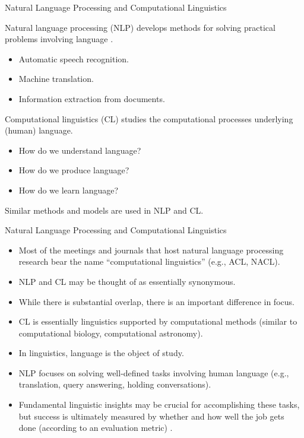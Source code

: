 \documentclass[handout]{beamer}
\begin{document}
\begin{frame}{Natural Language Processing and Computational Linguistics}
\begin{scriptsize}
Natural language processing (NLP) develops methods for solving practical problems involving language \cite{JohnsonMLSS}. \\


\begin{itemize}
\item Automatic speech recognition.
\item Machine translation.
\item Information extraction from documents.
\end{itemize}

Computational linguistics (CL) studies the computational processes underlying (human) language.

\begin{itemize}
 \item How do we understand language?
 \item How do we produce language?
 \item How do we learn language?
\end{itemize}

Similar methods and models are used in NLP and CL.
\end{scriptsize}
\end{frame}


\begin{frame}{Natural Language Processing and Computational Linguistics}
\begin{scriptsize}
\begin{itemize}
 \item Most of the meetings and journals that host natural language processing research bear the name ``computational linguistics'' (e.g., ACL, NACL). \cite{jacobbook}
 \item NLP and CL may be thought of as essentially synonymous.
 \item While there is substantial overlap, there is an important difference in focus.
 \item CL is essentially linguistics supported by computational methods (similar to computational biology, computational astronomy).
 \item In linguistics, language is the object of study.
 \item NLP focuses on solving well-defined tasks involving human language (e.g., translation, query answering, holding conversations).
 \item Fundamental linguistic insights may be crucial for accomplishing these tasks, but success is ultimately measured by whether and how well the job gets done (according to an evaluation metric) \cite{jacobbook}.
\end{itemize}


\end{scriptsize}
\end{frame}
\end{document}
